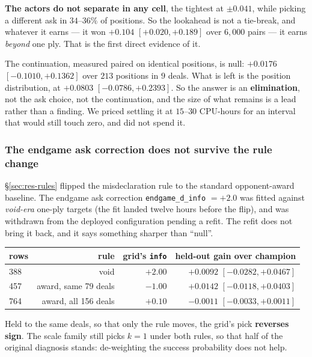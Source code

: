 \documentclass[11pt,letterpaper]{article}
\begin{document}
\textbf{The actors do not separate in any cell}, the tightest at $\pm0.041$,
while picking a different ask in $34$--$36\%$ of positions. So the lookahead is
not a tie-break, and whatever it earns --- it won $+0.104$ $[+0.020, +0.189]$
over $6{,}000$ pairs --- it earns \emph{beyond} one ply. That is the first
direct evidence of it.

The continuation, measured paired on identical positions, is null:
$+0.0176$ $[-0.1010, +0.1362]$ over $213$ positions in $9$ deals. What is left
is the position distribution, at $+0.0803$ $[-0.0786, +0.2393]$. So the answer
is an \textbf{elimination}, not the ask choice, not the continuation, and
the size of what remains is a lead rather than a finding. We priced settling it
at $15$--$30$ CPU-hours for an interval that would still touch zero, and did
not spend it.

\subsubsection{The endgame ask correction does not survive the rule change}

\S\ref{sec:res-rules} flipped the misdeclaration rule to the standard
opponent-award baseline. The endgame ask correction \texttt{endgame\_d\_info}
$= +2.0$ was fitted against \emph{void-era} one-ply targets (the fit landed
twelve hours before the flip), and was withdrawn from the deployed
configuration pending a refit. The refit does not bring it back, and it says
something sharper than ``null''.

\begin{center}\small
\begin{tabular}{@{}lrrr@{}}
\toprule
rows & rule & grid's \texttt{info} & held-out gain over champion \\
\midrule
388 & void & $+2.00$ & $+0.0092$ $[-0.0282, +0.0467]$ \\
457 & award, same 79 deals & $\mathbf{-1.00}$ & $+0.0142$ $[-0.0118, +0.0403]$ \\
764 & award, all 156 deals & $+0.10$ & $-0.0011$ $[-0.0033, +0.0011]$ \\
\bottomrule
\end{tabular}
\end{center}

Held to the same deals, so that only the rule moves, the grid's pick
\textbf{reverses sign}. The scale family still picks $k=1$ under both rules, so
that half of the original diagnosis stands: de-weighting the success
probability does not help.
\end{document}
